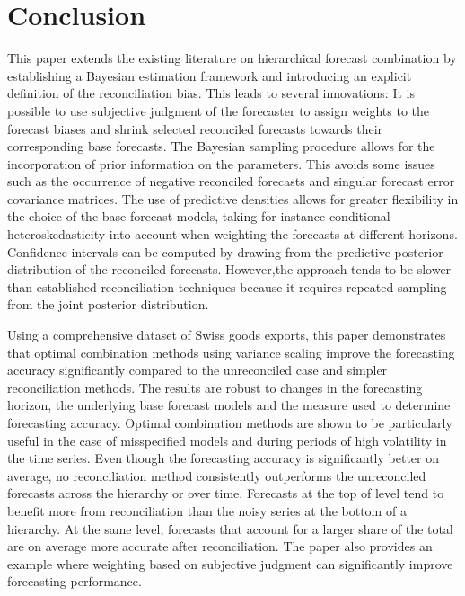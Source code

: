 \documentclass[a4paper,fleqn,11pt]{article}
\begin{document}
\section{Conclusion}\label{sec:conc}

This paper extends the existing literature on hierarchical forecast combination by establishing a Bayesian estimation framework and introducing an explicit definition of the reconciliation bias. This leads to several innovations: It is possible to use subjective judgment of the forecaster to assign weights to the forecast biases and shrink selected reconciled forecasts towards their corresponding base forecasts. The Bayesian sampling procedure allows for the incorporation of prior information on the parameters. This avoids some issues such as the occurrence of negative reconciled forecasts and singular forecast error covariance matrices. The use of predictive densities allows for greater flexibility in the choice of the base forecast models, taking for instance conditional heteroskedasticity into account when weighting the forecasts at different horizons. Confidence intervals can be computed by drawing from the predictive posterior distribution of the reconciled forecasts. However,the approach tends to be slower than established reconciliation techniques because it requires repeated sampling from the joint posterior distribution.

Using a comprehensive dataset of Swiss goods exports, this paper demonstrates that optimal combination methods using variance scaling improve the forecasting accuracy significantly compared to the unreconciled case and simpler reconciliation methods. The results are robust to changes in the forecasting horizon, the underlying base forecast models and the measure used to determine forecasting accuracy. Optimal combination methods are shown to be particularly useful in the case of misspecified models and during periods of high volatility in the time series. Even though the forecasting accuracy is significantly better on average, no reconciliation method consistently outperforms the unreconciled forecasts across the hierarchy or over time. Forecasts at the top of level tend to benefit more from reconciliation than the noisy series at the bottom of a hierarchy. At the same level, forecasts that account for a larger share of the total are on average more accurate after reconciliation. The paper also provides an example where weighting based on subjective judgment can significantly improve forecasting performance.


\clearpage


\clearpage


\end{document}
